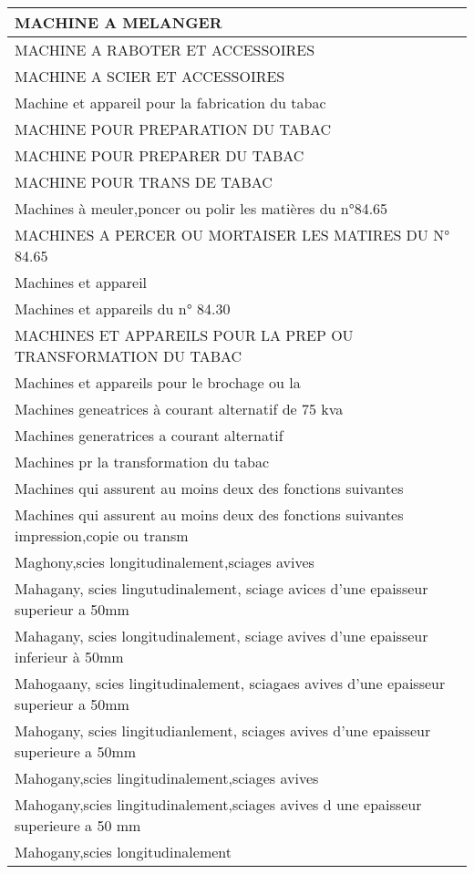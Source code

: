 \documentclass[
]{book}
\begin{document}
\begin{table}
\begin{tabular}[t]{l}
\hline
MACHINE A MELANGER\\
\hline
MACHINE A RABOTER ET ACCESSOIRES\\
\hline
MACHINE A SCIER ET ACCESSOIRES\\
\hline
Machine et appareil pour la fabrication du tabac\\
\hline
MACHINE POUR PREPARATION DU TABAC\\
\hline
MACHINE POUR PREPARER DU TABAC\\
\hline
MACHINE POUR TRANS DE TABAC\\
\hline
Machines à meuler,poncer ou polir les matières du n°84.65\\
\hline
MACHINES A PERCER OU MORTAISER LES MATIRES DU N° 84.65\\
\hline
Machines et appareil\\
\hline
Machines et appareils du n° 84.30\\
\hline
MACHINES ET APPAREILS POUR LA PREP OU TRANSFORMATION DU TABAC\\
\hline
Machines et appareils pour le brochage ou la\\
\hline
Machines geneatrices à courant alternatif de 75 kva\\
\hline
Machines generatrices a courant alternatif\\
\hline
Machines pr la transformation du tabac\\
\hline
Machines qui assurent au moins deux des fonctions suivantes\\
\hline
Machines qui assurent au moins deux des fonctions suivantes impression,copie ou transm\\
\hline
Maghony,scies longitudinalement,sciages avives\\
\hline
Mahagany, scies lingutudinalement, sciage avices d'une epaisseur superieur a 50mm\\
\hline
Mahagany, scies longitudinalement, sciage avives d'une epaisseur inferieur à 50mm\\
\hline
Mahogaany, scies lingitudinalement, sciagaes avives d'une epaisseur superieur a 50mm\\
\hline
Mahogany, scies lingitudianlement, sciages avives d'une epaisseur superieure a 50mm\\
\hline
Mahogany,scies lingitudinalement,sciages avives\\
\hline
Mahogany,scies lingitudinalement,sciages avives d une epaisseur superieure a 50 mm\\
\hline
Mahogany,scies longitudinalement\\
\hline

\end{tabular}
\end{table}
\end{document}
